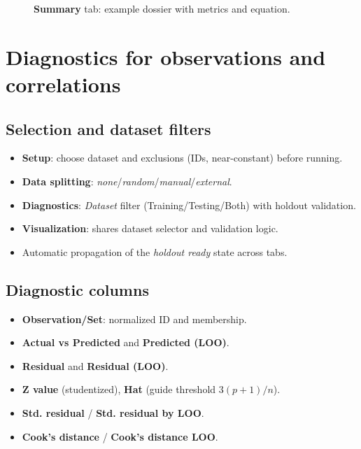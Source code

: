 \documentclass[12pt,a4paper]{article}
\begin{document}
\begin{figure}[H]
  \centering
  \fbox{\rule[0pt]{0pt}{120pt}\hspace{0.9\linewidth}}
  \caption{\textbf{Summary} tab: example dossier with metrics and equation.}
  \label{fig:summary}
\end{figure}

\section{Diagnostics for observations and correlations}
\subsection{Selection and dataset filters}
\begin{itemize}
  \item \textbf{Setup}: choose dataset and exclusions (IDs, near-constant) before running.
  \item \textbf{Data splitting}: \emph{none}/\emph{random}/\emph{manual}/\emph{external}.
  \item \textbf{Diagnostics}: \emph{Dataset} filter (Training/Testing/Both) with holdout validation.
  \item \textbf{Visualization}: shares dataset selector and validation logic.
  \item Automatic propagation of the \emph{holdout ready} state across tabs.
\end{itemize}

\subsection{Diagnostic columns}
\begin{itemize}
  \item \textbf{Observation/Set}: normalized ID and membership.
  \item \textbf{Actual vs Predicted} and \textbf{Predicted (LOO)}.
  \item \textbf{Residual} and \textbf{Residual (LOO)}.
  \item \textbf{Z value} (studentized), \textbf{Hat} (guide threshold $3(p+1)/n$).
  \item \textbf{Std. residual} / \textbf{Std. residual by LOO}.
  \item \textbf{Cook’s distance} / \textbf{Cook’s distance LOO}.
\end{itemize}
\end{document}
